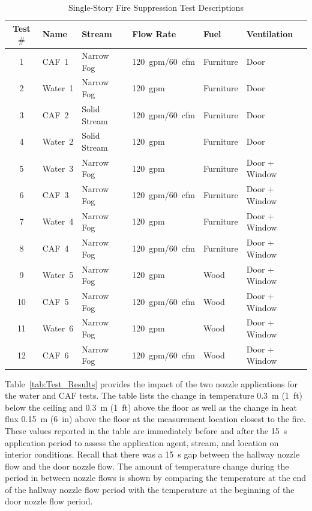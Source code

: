 \documentclass[12pt,oneside]{book}
\begin{document}
\begin{table}[!ht]
\centering
\caption{Single-Story Fire Suppression Test Descriptions}\label{tab:Test_Descriptions}
\begin{tabular}{clllll}
\toprule[1.5pt]
Test $\#$  & Name	& Stream			& Flow Rate		& Fuel           & Ventilation     \\
\midrule
 1 & CAF~1    &  Narrow Fog   &  120~gpm/60~cfm   & Furniture      & Door            \\
 2 & Water~1  &  Narrow Fog  	&  120~gpm    		& Furniture      & Door            \\
 3 & CAF~2    &  Solid Stream       &  120~gpm/60~cfm   & Furniture      & Door            \\
 4 & Water~2  &  Solid Stream       &  120~gpm    		& Furniture      & Door            \\
 5 & Water~3  &  Narrow Fog  	&  120~gpm    		& Furniture      & Door + Window   \\
 6 & CAF~3    &  Narrow Fog   &  120~gpm/60~cfm   & Furniture      & Door + Window   \\
 7 & Water~4  &  Narrow Fog  	&  120~gpm    		& Furniture      & Door + Window   \\
 8 & CAF~4    &  Narrow Fog   &  120~gpm/60~cfm   & Furniture      & Door + Window   \\
 9 & Water~5  &  Narrow Fog  	&  120~gpm   		& Wood           & Door + Window   \\
10 & CAF~5    &  Narrow Fog   &  120~gpm/60~cfm   & Wood           & Door + Window   \\
11 & Water~6  &  Narrow Fog  	&  120~gpm    		& Wood           & Door + Window   \\
12 & CAF~6    &  Narrow Fog   &  120~gpm/60~cfm   & Wood           & Door + Window   \\
\bottomrule[1.25pt]
\end{tabular}\par
\end{table}

Table~\ref{tab:Test_Results} provides the impact of the two nozzle applications for the water and CAF tests. The table lists the change in temperature 0.3~m (1~ft) below the ceiling and 0.3~m (1~ft) above the floor as well as the change in heat flux 0.15~m (6~in) above the floor at the measurement location closest to the fire. These values reported in the table are immediately before and after the 15~s application period to assess the application agent, stream, and location on interior conditions. Recall that there was a 15~s gap between the hallway nozzle flow and the door nozzle flow. The amount of temperature change during the period in between nozzle flows is shown by comparing the temperature at the end of the hallway nozzle flow period with the temperature at the beginning of the door nozzle flow period.
\end{document}
